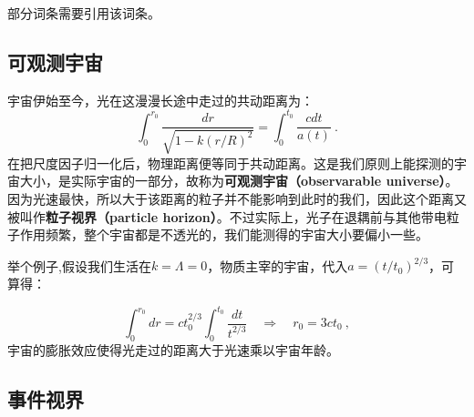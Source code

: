 
\begin{issues}
\issueTODO
部分词条需要引用该词条。
\end{issues}

\subsection{可观测宇宙}
宇宙伊始至今，光在这漫漫长途中走过的共动距离为：
\begin{equation}
\int_{0}^{r_{0}} \frac{d r}{\sqrt{1-k (r/R)^{2}}}=\int_{0}^{t_{0}} \frac{c d t}{a(t)}~.
\end{equation}
在把尺度因子归一化后，物理距离便等同于共动距离。这是我们原则上能探测的宇宙大小，是实际宇宙的一部分，故称为\textbf{可观测宇宙（observarable universe）}。因为光速最快，所以大于该距离的粒子并不能影响到此时的我们，因此这个距离又被叫作\textbf{粒子视界（particle horizon）}。不过实际上，光子在退耦前与其他带电粒子作用频繁，整个宇宙都是不透光的，我们能测得的宇宙大小要偏小一些。

举个例子,假设我们生活在$k=\Lambda=0$，物质主宰的宇宙，代入$a=(t/t_0)^{2/3}$，可算得：

\begin{equation}\int_0^{r_0}dr=ct_0^{2/3}\int_0^{t_0}\frac{dt}{t^{2/3}}\quad\Longrightarrow\quad r_0=3ct_0 ~,\end{equation}
宇宙的膨胀效应使得光走过的距离大于光速乘以宇宙年龄。

\subsection{事件视界}

